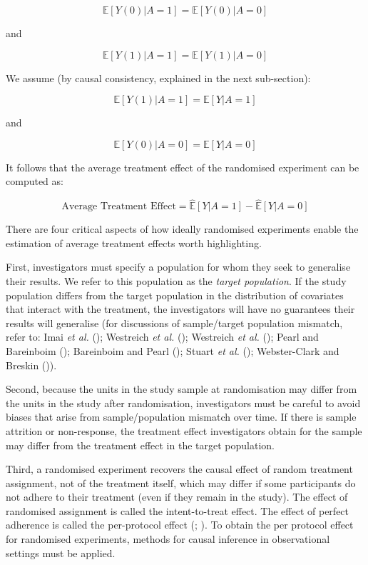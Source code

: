 \documentclass[
  single column]{article}
\begin{document}
\[
\mathbb{E}[Y(0) | A = 1] = \mathbb{E}[Y(0) | A = 0]
\]

and

\[
\mathbb{E}[Y(1) | A = 1] = \mathbb{E}[Y(1) | A = 0]
\]

We assume (by causal consistency, explained in the next sub-section):

\[ 
\mathbb{E}[Y(1) | A = 1] = \mathbb{E}[Y | A = 1]
\]

and

\[
\mathbb{E}[Y(0) | A = 0] = \mathbb{E}[Y | A = 0]
\]

It follows that the average treatment effect of the randomised
experiment can be computed as:

\[
\text{Average Treatment Effect} = \widehat{\mathbb{E}}[Y | A = 1] - \widehat{\mathbb{E}}[Y | A = 0]
\]

There are four critical aspects of how ideally randomised experiments
enable the estimation of average treatment effects worth highlighting.

First, investigators must specify a population for whom they seek to
generalise their results. We refer to this population as the
\emph{target population}. If the study population differs from the
target population in the distribution of covariates that interact with
the treatment, the investigators will have no guarantees their results
will generalise (for discussions of sample/target population mismatch,
refer to: Imai \emph{et al.}
(); Westreich \emph{et
al.} (); Westreich \emph{et al.}
(); Pearl and Bareinboim
(); Bareinboim and Pearl
(); Stuart \emph{et al.}
(); Webster-Clark and
Breskin ()).

Second, because the units in the study sample at randomisation may
differ from the units in the study after randomisation, investigators
must be careful to avoid biases that arise from sample/population
mismatch over time. If there is sample attrition or non-response, the
treatment effect investigators obtain for the sample may differ from the
treatment effect in the target population.

Third, a randomised experiment recovers the causal effect of random
treatment assignment, not of the treatment itself, which may differ if
some participants do not adhere to their treatment (even if they remain
in the study). The effect of randomised assignment is called the
intent-to-treat effect. The effect of perfect adherence is called the
per-protocol effect (; ). To obtain the
per protocol effect for randomised experiments, methods for causal
inference in observational settings must be applied.
\end{document}
